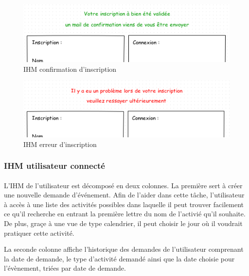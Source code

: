 \documentclass[a4paper,11pt]{article}
\begin{document}
\begin{figure}[H]
  \begin{center}
    \includegraphics[width=15cm]{../../IHM/IHM_connection_utilisateur_conf_ins_z.png}
    \caption{IHM confirmation d'inscription}
  \end{center}
\end{figure}

\begin{figure}[H]
  \begin{center}
    \includegraphics[width=15cm]{../../IHM/IHM_connection_utilisateur_erreur_ins_z.png}
    \caption{IHM erreur d'inscription}
  \end{center}
\end{figure}

\pagebreak
\subsubsection{IHM utilisateur connecté}

\paragraph{}
L'IHM de l'utilisateur est décomposé en deux colonnes. La première sert à créer une nouvelle demande d'événement. Afin de l'aider dans cette tâche, l'utilisateur à accès à une liste des activités possibles dans laquelle il peut trouver facilement ce qu'il recherche en entrant la première lettre du nom de l'activié qu'il souhaite. De plus, graçe à une vue de type calendrier, il peut choisir le jour où il voudrait pratiquer cette activité.

La seconde colonne affiche l'historique des demandes de l'utilisateur comprenant la date de demande, le type d'activité demandé ainsi que la date choisie pour l'évènement, triées par date de demande.
\end{document}
